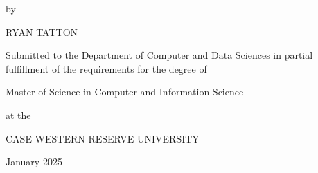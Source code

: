 \begin{titlepage}
\centering

\Large

\MakeUppercase{\thesisTitle}

\vspace{0.1in}

\large

by

\vspace{0.1in}

\Large

\MakeUppercase{Ryan Tatton}

\vspace{0.1in}

\large

Submitted to the Department of Computer and Data Sciences in partial fulfillment of the requirements for the degree of

\vspace{0.1in}

Master of Science in Computer and Information Science

\vspace{0.1in}

at the

\vspace{0.1in}

\MakeUppercase{Case Western Reserve University}

\vspace{0.1in}

January 2025
\end{titlepage}